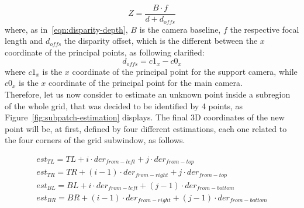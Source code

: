 \begin{equation}
	\label{eqn:middlebury-depth-disp}
	Z = \frac{B \cdot f}{d + d_{offs}}
\end{equation}
where, as in~\ref{eqn:disparity-depth}, $B$ is the camera baseline, $f$ the respective focal length and $d_{offs}$ the disparity offset, which is the different between the $x$ coordinate of the principal points, as following clarified:
\begin{equation}
	\label{eqn:doffs-equality}
	d_{offs} = c1_x - c0_x
\end{equation}
where $c1_x$ is the $x$ coordinate of the principal point for the support camera, while $c0_x$ is the $x$ coordinate of the principal point for the main camera.\\
Therefore, let us now consider to estimate an unknown point inside a subregion of the whole grid, that was decided to be identified by 4 points, as Figure~\ref{fig:subpatch-estimation} displays.
The final 3D coordinates of the new point will be, at first, defined by four different estimations, each one related to the four corners of the grid subwindow, as follows.

\begin{subequations}
\label{eqn:point-patch-estimation}
	\begin{align}
		est_{TL} = TL + i \cdot der_{from-left} + j \cdot der_{from-top} \\
		est_{TR} = TR + (i-1) \cdot der_{from-right} + j \cdot der_{from-top} \\
		est_{BL} = BL + i \cdot der_{from-left} + (j-1) \cdot der_{from-bottom} \\
		est_{BR} = BR + (i-1) \cdot der_{from-right} + (j-1) \cdot der_{from-bottom}
	\end{align}
\end{subequations}

